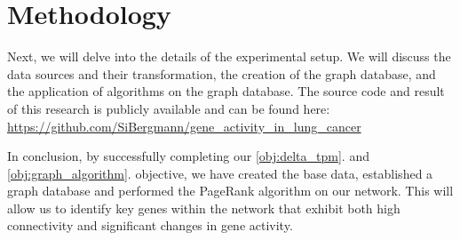 \section{Methodology} \label{sec:methodology}
Next, we will delve into the details of the experimental setup.
We will discuss the data sources and their transformation, the creation of the graph database,
and the application of algorithms on the graph database.
The source code and result of this research is publicly available and can be found here:\\
\url{https://github.com/SiBergmann/gene_activity_in_lung_cancer}










In conclusion, by successfully completing our \ref{obj:delta_tpm}. and \ref{obj:graph_algorithm}. objective,
we have created the base data, established a graph database and performed the PageRank algorithm on our network.
This will allow us to identify key genes within the network that exhibit both high connectivity
and significant changes in gene activity.
